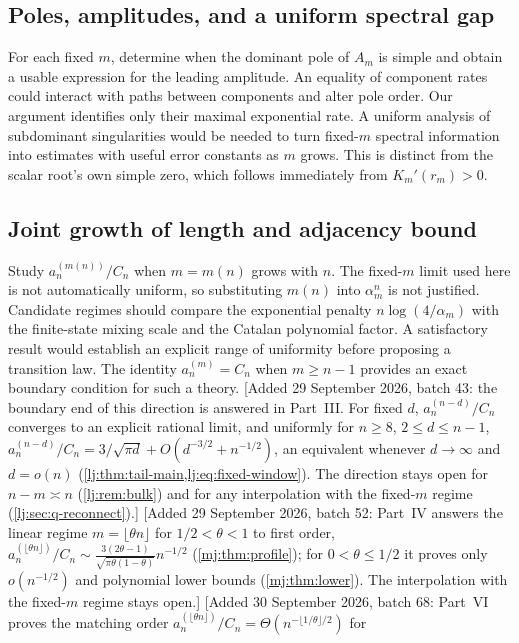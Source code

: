 \documentclass[11pt,a4paper]{article}
\theoremstyle{definition}\newaliascnt{definition}{theorem}
\theoremstyle{remark}\newaliascnt{remark}{theorem}
\begin{document}
\subsection{Poles, amplitudes, and a uniform spectral gap}
For each fixed $m$, determine when the dominant pole of $A_m$ is simple and
obtain a usable expression for the leading amplitude. An equality of
component rates could interact with paths between components and alter pole
order. Our argument identifies only their maximal exponential rate. A
uniform analysis of subdominant singularities would be needed to turn
fixed-$m$ spectral information into estimates with useful error constants as
$m$ grows. This is distinct from the scalar root's own simple zero, which
follows immediately from $K_m'(r_m)>0$.

\subsection{Joint growth of length and adjacency bound}\label{jg:sec:crem-joint}%
Study $a_n^{(m(n))}/C_n$ when $m=m(n)$ grows with $n$. The fixed-$m$ limit
used here is not automatically uniform, so substituting $m(n)$ into
$\alpha_m^n$ is not justified. Candidate regimes should compare the
exponential penalty $n\log(4/\alpha_m)$ with the finite-state mixing scale
and the Catalan polynomial factor. A satisfactory result would establish an
explicit range of uniformity before proposing a transition law. The identity
$a_n^{(m)}=C_n$ when $m\ge n-1$ provides an exact boundary condition for such
a theory.
[Added 29 September 2026, batch 43: the boundary end of this direction is
answered in Part~III. For fixed $d$, $a_n^{(n-d)}/C_n$ converges to an
explicit rational limit, and uniformly for $n\ge8$, $2\le d\le n-1$,
$a_n^{(n-d)}/C_n=3/\sqrt{\pi d}+O(d^{-3/2}+n^{-1/2})$, an equivalent whenever
$d\to\infty$ and $d=o(n)$ (\cref{lj:thm:tail-main,lj:eq:fixed-window}). The
direction stays open for $n-m\asymp n$ (\cref{lj:rem:bulk}) and for any
interpolation with the fixed-$m$ regime (\cref{lj:sec:q-reconnect}).]
[Added 29 September 2026, batch 52: Part~IV answers the linear regime
$m=\lfloor\theta n\rfloor$ for $1/2<\theta<1$ to first order,
$a_n^{(\lfloor\theta n\rfloor)}/C_n\sim\frac{3(2\theta-1)}
{\sqrt{\pi\theta(1-\theta)}}n^{-1/2}$ (\cref{mj:thm:profile}); for
$0<\theta\le1/2$ it proves only $o(n^{-1/2})$ and polynomial lower bounds
(\cref{mj:thm:lower}). The interpolation with the fixed-$m$ regime stays
open.]
[Added 30 September 2026, batch 68: Part~VI proves the matching order
$a_n^{(\lfloor\theta n\rfloor)}/C_n=\Theta(n^{-\lfloor1/\theta\rfloor/2})$ for
\end{document}
